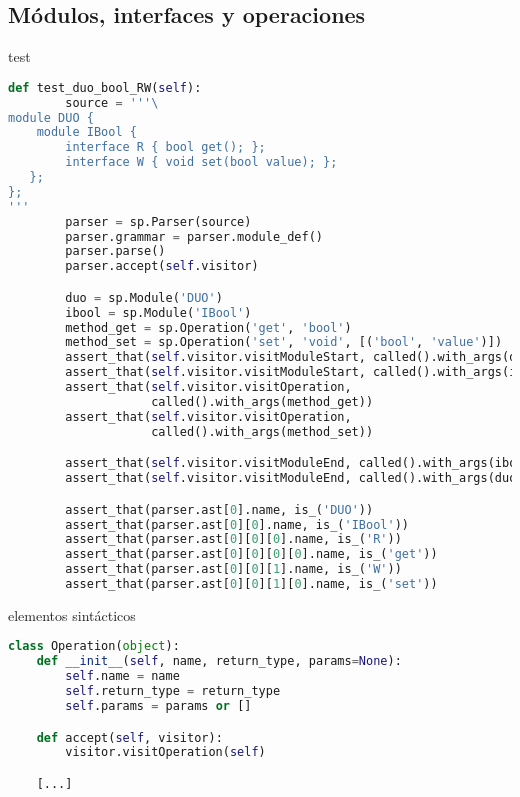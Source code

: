 \documentclass[11pt]{beamer}
\begin{document}
\subsection{Módulos, interfaces y operaciones}

\begin{frame}[fragile]{test}
\begin{lstlisting}[language=Python, basicstyle = \tiny\lstfont]
    def test_duo_bool_RW(self):
        source = '''\
module DUO {
    module IBool {
        interface R { bool get(); };
        interface W { void set(bool value); };
   };
};
'''
        parser = sp.Parser(source)
        parser.grammar = parser.module_def()
        parser.parse()
        parser.accept(self.visitor)

        duo = sp.Module('DUO')
        ibool = sp.Module('IBool')
        method_get = sp.Operation('get', 'bool')
        method_set = sp.Operation('set', 'void', [('bool', 'value')])
        assert_that(self.visitor.visitModuleStart, called().with_args(duo))
        assert_that(self.visitor.visitModuleStart, called().with_args(ibool))
        assert_that(self.visitor.visitOperation,
                    called().with_args(method_get))
        assert_that(self.visitor.visitOperation,
                    called().with_args(method_set))

        assert_that(self.visitor.visitModuleEnd, called().with_args(ibool))
        assert_that(self.visitor.visitModuleEnd, called().with_args(duo))

        assert_that(parser.ast[0].name, is_('DUO'))
        assert_that(parser.ast[0][0].name, is_('IBool'))
        assert_that(parser.ast[0][0][0].name, is_('R'))
        assert_that(parser.ast[0][0][0][0].name, is_('get'))
        assert_that(parser.ast[0][0][1].name, is_('W'))
        assert_that(parser.ast[0][0][1][0].name, is_('set'))
  \end{lstlisting}
\end{frame}


\begin{frame}[fragile]{elementos sintácticos}
\begin{lstlisting}[language=Python]
class Operation(object):
    def __init__(self, name, return_type, params=None):
        self.name = name
        self.return_type = return_type
        self.params = params or []

    def accept(self, visitor):
        visitor.visitOperation(self)

    [...]
\end{lstlisting}
\end{frame}
\end{document}
